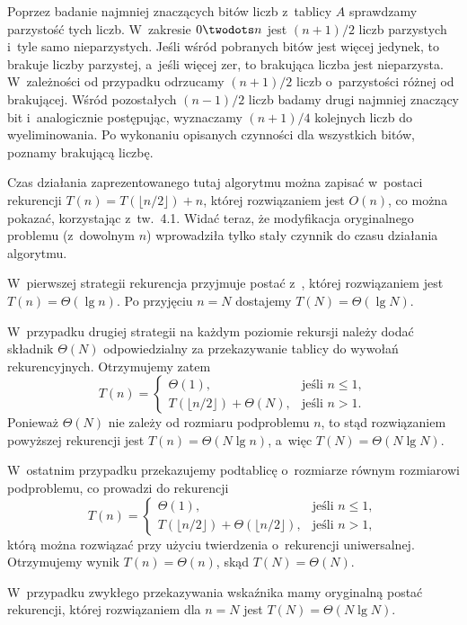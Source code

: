Poprzez badanie najmniej znaczących bitów liczb z~tablicy $A$ sprawdzamy parzystość tych liczb. W~zakresie $0\twodots n$ jest $(n+1)/2$ liczb parzystych i~tyle samo nieparzystych. Jeśli wśród pobranych bitów jest więcej jedynek, to brakuje liczby parzystej, a~jeśli więcej zer, to brakująca liczba jest nieparzysta. W~zależności od przypadku odrzucamy $(n+1)/2$ liczb o~parzystości różnej od brakującej. Wśród pozostałych $(n-1)/2$ liczb badamy drugi najmniej znaczący bit i~analogicznie postępując, wyznaczamy $(n+1)/4$ kolejnych liczb do wyeliminowania. Po wykonaniu opisanych czynności dla wszystkich bitów, poznamy brakującą liczbę.

Czas działania zaprezentowanego tutaj algorytmu można zapisać w~postaci rekurencji $T(n)=T(\lfloor n/2\rfloor)+n$, której rozwiązaniem jest $O(n)$, co można pokazać, korzystając z~tw.~4.1. Widać teraz, że modyfikacja oryginalnego problemu (z~dowolnym $n$) wprowadziła tylko stały czynnik do czasu działania algorytmu.


\subproblem %
W~pierwszej strategii rekurencja przyjmuje postać z~, której rozwiązaniem jest $T(n)=\Theta(\lg n)$. Po przyjęciu $n=N$ dostajemy $T(N)=\Theta(\lg N)$.

W~przypadku drugiej strategii na każdym poziomie rekursji należy dodać składnik $\Theta(N)$ odpowiedzialny za przekazywanie tablicy do wywołań rekurencyjnych. Otrzymujemy zatem
\[
	T(n) = \begin{cases}
		\Theta(1), & \text{jeśli $n\le1$}, \\
		T(\lfloor n/2\rfloor)+\Theta(N), & \text{jeśli $n>1$}.
	\end{cases}
\]
Ponieważ $\Theta(N)$ nie zależy od rozmiaru podproblemu $n$, to stąd rozwiązaniem powyższej rekurencji jest $T(n)=\Theta(N\lg n)$, a~więc $T(N)=\Theta(N\lg N)$.

W~ostatnim przypadku przekazujemy podtablicę o~rozmiarze równym rozmiarowi podproblemu, co prowadzi do rekurencji
\[
	T(n) = \begin{cases}
		\Theta(1), & \text{jeśli $n\le1$}, \\
		T(\lfloor n/2\rfloor)+\Theta(\lfloor n/2\rfloor), & \text{jeśli $n>1$},
	\end{cases}
\]
którą można rozwiązać przy użyciu twierdzenia o~rekurencji uniwersalnej. Otrzymujemy wynik $T(n)=\Theta(n)$, skąd $T(N)=\Theta(N)$.

\subproblem %
W~przypadku zwykłego przekazywania wskaźnika mamy oryginalną postać rekurencji, której rozwiązaniem dla $n=N$ jest $T(N)=\Theta(N\lg N)$.

